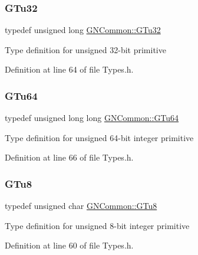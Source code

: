 \subsubsection{\texorpdfstring{G\+Tu32}{GTu32}}
{\footnotesize\ttfamily typedef unsigned long \mbox{\hyperlink{namespace_g_n_common_ae5485474bc8f23e462e920a17b377b53}{G\+N\+Common\+::\+G\+Tu32}}}

Type definition for unsigned 32-\/bit primitive 

Definition at line 64 of file Types.\+h.

\mbox{\label{namespace_g_n_common_a01e8527dabf7ab4f123156b0701945eb}} 
\subsubsection{\texorpdfstring{G\+Tu64}{GTu64}}
{\footnotesize\ttfamily typedef unsigned long long \mbox{\hyperlink{namespace_g_n_common_a01e8527dabf7ab4f123156b0701945eb}{G\+N\+Common\+::\+G\+Tu64}}}

Type definition for unsigned 64-\/bit integer primitive 

Definition at line 66 of file Types.\+h.

\mbox{\label{namespace_g_n_common_a551fbbb7c62c00956ef69d960ca9ccc3}} 
\subsubsection{\texorpdfstring{G\+Tu8}{GTu8}}
{\footnotesize\ttfamily typedef unsigned char \mbox{\hyperlink{namespace_g_n_common_a551fbbb7c62c00956ef69d960ca9ccc3}{G\+N\+Common\+::\+G\+Tu8}}}

Type definition for unsigned 8-\/bit integer primitive 

Definition at line 60 of file Types.\+h.

